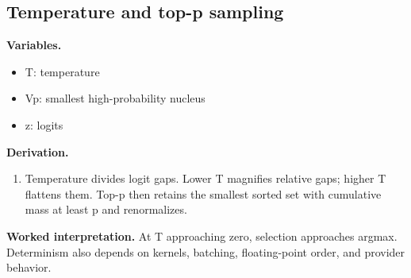 \subsection{Temperature and top-p sampling}
\textbf{Variables.}\begin{itemize}
\item T: temperature
\item Vp: smallest high-probability nucleus
\item z: logits
\end{itemize}
\textbf{Derivation.}\begin{derivation}\begin{enumerate}
\item Temperature divides logit gaps. Lower T magnifies relative gaps; higher T flattens them. Top-p then retains the smallest sorted set with cumulative mass at least p and renormalizes.
\end{enumerate}\end{derivation}
\textbf{Worked interpretation.} At T approaching zero, selection approaches argmax. Determinism also depends on kernels, batching, floating-point order, and provider behavior.
